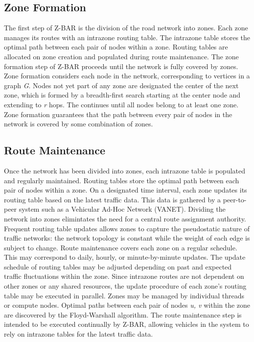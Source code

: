 \documentclass[conference]{IEEEtran}
\begin{document}
\subsection{Zone Formation}

The first step of Z-BAR is the division of the road network into zones. Each zone manages its routes with an intrazone routing table. The intrazone table stores the optimal path between each pair of nodes within a zone. Routing tables are allocated on zone creation and populated during route maintenance. The zone formation step of Z-BAR proceeds until the network is fully covered by zones. Zone formation considers each node in the network, corresponding to vertices in a graph \textit{G}. Nodes not yet part of any zone are designated the center of the next zone, which is formed by a breadth-first search starting at the center node and extending to \textit{r} hops. The continues until all nodes belong to at least one zone. Zone formation guarantees that the path between every pair of nodes in the network is covered by some combination of zones.

\subsection{Route Maintenance} %

Once the network has been divided into zones, each intrazone table is populated and regularly maintained. Routing tables store the optimal path between each pair of nodes within a zone. On a designated time interval, each zone updates its routing table based on the latest traffic data. This data is gathered by a peer-to-peer system such as a Vehicular Ad-Hoc Network (VANET). Dividing the network into zones elimintates the need for a central route assignment authority. Frequent routing table updates allows zones to capture the pseudostatic nature of traffic networks: the network topology is constant while the weight of each edge is subject to change. Route maintenance covers each zone on a regular schedule. This may correspond to daily, hourly, or minute-by-minute updates. The update schedule of routing tables may be adjusted depending on past and expected traffic fluctuations within the zone. Since intrazone routes are not dependent on other zones or any shared resources, the update procedure of each zone's routing table may be executed in parallel. Zones may be managed by individual threads or compute nodes. Optimal paths between each pair of nodes \textit{u, v} within the zone are discovered by the Floyd-Warshall algorithm. The route maintenance step is intended to be executed continually by Z-BAR, allowing vehicles in the system to rely on intrazone tables for the latest traffic data.
\end{document}
